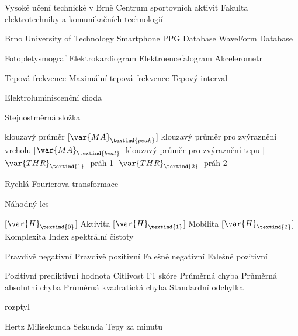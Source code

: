\cleardoublepage
\chapter*{\listofabbrevname}
{}

\begin{acronym}[KolikMista]	%

			{Vysoké učení technické v Brně}
			{Centrum sportovních aktivit}
			{Fakulta elektrotechniky a komunikačních technologií}

		{Brno University of Technology Smartphone PPG Database}
			{WaveForm Database}

			{Fotopletysmograf}
			{Elektrokardiogram}
			{Elektroencefalogram}
			{Akcelerometr}

			{Tepová frekvence}
			{Maximální tepová frekvence}
			{Tepový interval}

			{Elektroluminiscenční dioda}

			{Stejnostměrná složka}

			{klouzavý průměr}
		[\ensuremath{\var{MA}_\textind{peak}}]
			{klouzavý průměr pro zvýraznění vrcholu}
		[\ensuremath{\var{MA}_\textind{beat}}]
		{klouzavý průměr pro zvýraznění tepu}
		[\ensuremath{\var{THR}_\textind{1}}]
		{práh 1}
		[\ensuremath{\var{THR}_\textind{2}}]
		{práh 2}
	
			{Rychlá Fourierova transformace}


			{Náhodný les}

		[\ensuremath{\var{H}_\textind{0}}]
		{Aktivita}
		[\ensuremath{\var{H}_\textind{1}}]
		{Mobilita}
		[\ensuremath{\var{H}_\textind{2}}]
		{Komplexita}
			{Index spektrální čistoty}

			{Pravdivě negativní}
			{Pravdivě pozitivní}
			{Falešně negativní}
			{Falešně pozitivní}

			{Pozitivní prediktivní hodnota}
			{Citlivost}
			{F1 skóre}
			{Průměrná chyba}
			{Průměrná absolutní chyba}
			{Průměrná kvadratická chyba}
			{Standardní odchylka}

			{rozptyl}

			{Hertz}
			{Milisekunda}
			{Sekunda}
			{Tepy za minutu}


\end{acronym}
